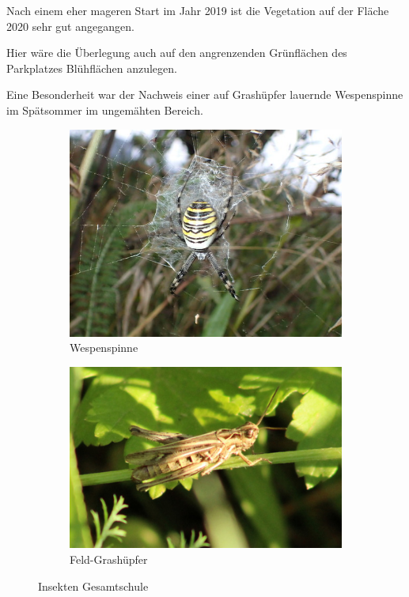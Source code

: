 \documentclass[10pt]{article}
\begin{document}
Nach einem eher mageren Start im Jahr 2019 ist die Vegetation auf der Fläche 2020 sehr gut angegangen.

Hier wäre die Überlegung auch auf den angrenzenden Grünflächen des Parkplatzes Blühflächen anzulegen.

Eine Besonderheit war der Nachweis einer auf Grashüpfer lauernde Wespenspinne im Spätsommer im ungemähten Bereich.


\begin{figure}[h!]
  \centering
  \begin{subfigure}[b]{0.34\linewidth}
    \includegraphics[width=\linewidth]{img/gesamtschule/wespenspinne.jpg}
    \caption{Wespenspinne}
  \end{subfigure}
  \begin{subfigure}[b]{0.38\linewidth}
    \includegraphics[width=\linewidth]{img/gesamtschule/grashuepfer.jpg}
    \caption{Feld-Grashüpfer}
  \end{subfigure}
  \caption{Insekten Gesamtschule}
\end{figure}
\end{document}
